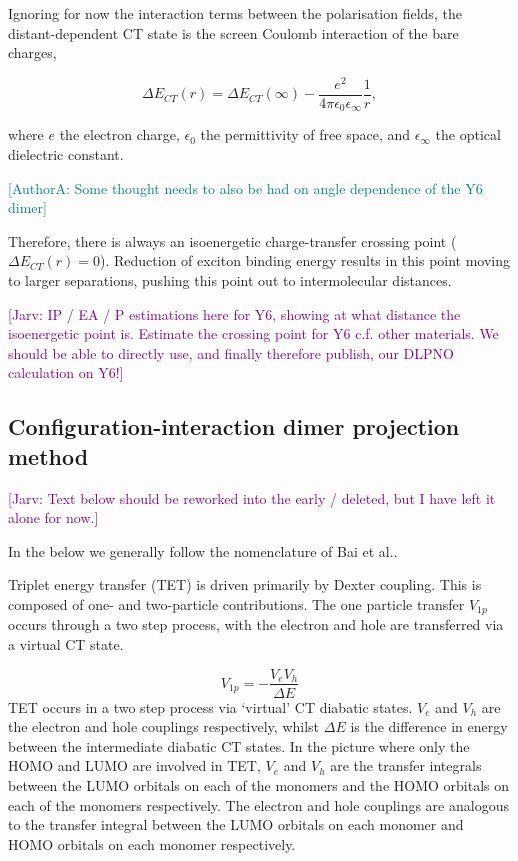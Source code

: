 \documentclass[aps,physrev,reprint,superscriptaddress,nofootinbib,amsmath,amssymb,a4paper]{revtex4-2}
\newcommand{\jarv}[1]{\textcolor{purple}{[Jarv: #1]}}
\newcommand{\izzy}[1]{\textcolor{teal}{[AuthorA: #1]}}
\begin{document}
Ignoring for now the interaction terms between the polarisation fields, the distant-dependent CT state is the screen Coulomb interaction of the bare charges, 

\begin{equation}
    \Delta E_{CT}(r) = \Delta E_{CT}(\infty) - \frac{e^2}{4\pi \epsilon_0 \epsilon_\infty}\frac{1}{r},  
\end{equation}

where $e$ the electron charge, $\epsilon_0$ the permittivity of free space, and $\epsilon_\infty$ the optical dielectric constant. 

\izzy{Some thought needs to also be had on angle dependence of the Y6 dimer}

Therefore, there is always an isoenergetic charge-transfer crossing point ($\Delta E_{CT}(r) = 0$). 
Reduction of exciton binding energy results in this point moving to larger separations, pushing this point out to intermolecular distances.

\jarv{IP / EA / P estimations here for Y6, showing at what distance the isoenergetic point is. Estimate the crossing point for Y6 c.f. other materials. 
We should be able to directly use, and finally therefore publish, our DLPNO calculation on Y6!}

\subsection{Configuration-interaction dimer projection method}

\jarv{Text below should be reworked into the early / deleted, but I have left it alone for now.}

In the below we generally follow the nomenclature of Bai et al.\cite{Bai2020}. 

Triplet energy transfer (TET) is driven primarily by Dexter coupling\cite{You2013}. This is composed of one- and two-particle contributions. The one particle transfer $V_{1p}$ occurs through a two step process, with the electron and hole are transferred via a virtual CT state. 

\begin{equation}
    V_{1p} = - \frac{V_eV_h}{\Delta E}
\end{equation}
%
TET occurs in a two step process via `virtual' CT diabatic states. $V_e$ and $V_h$ are the electron and hole couplings respectively, whilst $\Delta E$ is the difference in energy between the intermediate diabatic CT states. In the picture where only the HOMO and LUMO are involved in TET, $V_e$ and $V_h$ are the transfer integrals between the LUMO orbitals on each of the monomers and the HOMO orbitals on each of the monomers respectively. The electron and hole couplings are analogous to the transfer integral between the LUMO orbitals on each monomer and HOMO orbitals on each monomer respectively.
\end{document}
